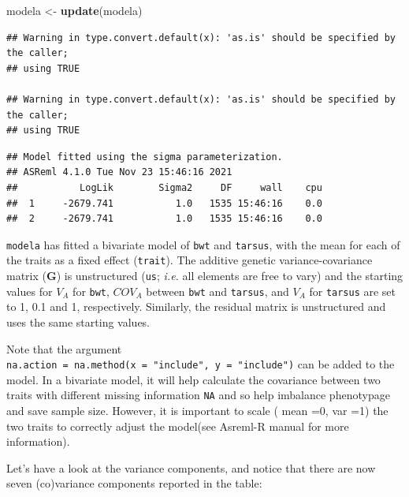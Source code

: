 \documentclass[
  12pt,
]{book}
\newenvironment{Shaded}{\begin{snugshade}}{\end{snugshade}}
\newcommand{\KeywordTok}[1]{\textcolor[rgb]{0.13,0.29,0.53}{\textbf{#1}}}
\newcommand{\NormalTok}[1]{#1}
\newcommand{\OperatorTok}[1]{\textcolor[rgb]{0.81,0.36,0.00}{\textbf{#1}}}
\newcommand{\StringTok}[1]{\textcolor[rgb]{0.31,0.60,0.02}{#1}}
\begin{document}
\begin{Shaded}
\begin{Highlighting}[]
\NormalTok{modela \textless{}{-}}\StringTok{ }\KeywordTok{update}\NormalTok{(modela)}
\end{Highlighting}
\end{Shaded}

\begin{verbatim}
## Warning in type.convert.default(x): 'as.is' should be specified by the caller;
## using TRUE

## Warning in type.convert.default(x): 'as.is' should be specified by the caller;
## using TRUE
\end{verbatim}

\begin{verbatim}
## Model fitted using the sigma parameterization.
## ASReml 4.1.0 Tue Nov 23 15:46:16 2021
##           LogLik        Sigma2     DF     wall    cpu
##  1     -2679.741           1.0   1535 15:46:16    0.0
##  2     -2679.741           1.0   1535 15:46:16    0.0
\end{verbatim}

\texttt{modela} has fitted a bivariate model of \texttt{bwt} and \texttt{tarsus}, with the mean for each of the traits as a fixed effect (\texttt{trait}). The additive genetic variance-covariance matrix (\(\textbf{G}\)) is unstructured (\texttt{us}; \emph{i.e.} all elements are free to vary) and the starting values for \(V_A\) for \texttt{bwt}, \(COV_A\) between \texttt{bwt} and \texttt{tarsus}, and \(V_A\) for \texttt{tarsus} are set to 1, 0.1 and 1, respectively. Similarly, the residual matrix is unstructured and uses the same starting values.

Note that the argument \texttt{na.action\ =\ na.method(x\ =\ "include",\ y\ =\ "include")} can be added to the model. In a bivariate model, it will help calculate the covariance between two traits with different missing information \texttt{NA} and so help imbalance phenotypage and save sample size. However, it is important to scale ( mean =0, var =1) the two traits to correctly adjust the model(see Asreml-R manual for more information).

Let's have a look at the variance components, and notice that there are now seven (co)variance components reported in the table:

\begin{Shaded}
\end{Shaded}
\end{document}

